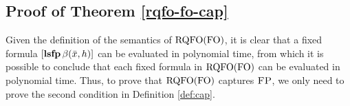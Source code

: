 \subsection*{Proof of Theorem \ref{rqfo-fo-cap}}

Given the definition of the semantics of ${\rm RQFO}({\rm FO})$, it is clear that a fixed formula $[{\bf lsfp} \, \beta(\bar{x}, h)]$ can be evaluated in polynomial time, from which it is possible to conclude that each fixed formula in ${\rm RQFO}({\rm FO})$ can be evaluated in polynomial time. Thus, to prove that ${\rm RQFO}({\rm FO})$ captures $\text{\sc FP}$, we only need to prove the second condition in Definition \ref{def:cap}.
%
%
%
%
